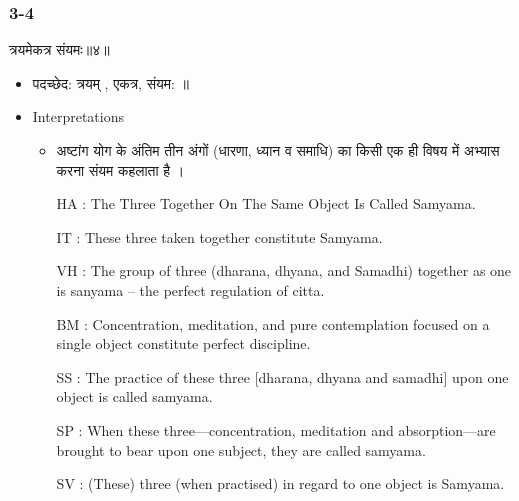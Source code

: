 \begin{frame}[fragile]\frametitle{3-4}
\begin{sanskrit}
त्रयमेकत्र संयमः॥४॥
\end{sanskrit}

	\begin{itemize}
	\item पदच्छेद: त्रयम् , एकत्र, संयम: ॥
	\item Interpretations
		\begin{itemize}	
		\item अष्टांग योग के अंतिम तीन अंगों (धारणा, ध्यान व समाधि) का किसी एक ही विषय में अभ्यास करना संयम कहलाता है ।
		\item [HA]: The Three Together On The Same Object Is Called Samyama.
		\item [IT]: These three taken together constitute Samyama.
		\item [VH]: The group of three (dharana, dhyana, and Samadhi) together as one is sanyama – the perfect regulation of citta.
		\item [BM]: Concentration, meditation, and pure contemplation focused on a single object constitute perfect discipline.
		\item [SS]: The practice of these three [dharana, dhyana and samadhi] upon one object is called samyama.
		\item [SP]: When these three—concentration, meditation and absorption—are brought to bear upon one subject, they are called samyama.
		\item [SV]: (These) three (when practised) in regard to one object is Samyama. 
		\end{itemize}
	\end{itemize}
\end{frame}


